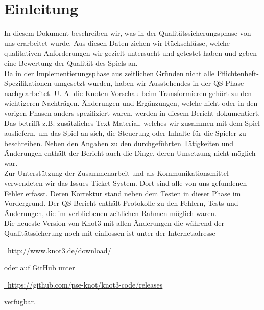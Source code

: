 %



\chapter{Einleitung}
\label{Kapitel:Einleitung}

In diesem Dokument beschreiben wir, was in der Qualitätssicherungsphase von uns erarbeitet wurde. Aus diesen Daten ziehen wir Rückschlüsse, welche qualitativen Anforderungen wir gezielt untersucht und getestet haben und geben eine Bewertung der Qualität des Spiels an.\\

Da in der Implementierungsphase aus zeitlichen Gründen nicht alle Pflichtenheft-Spezifikationen umgesetzt wurden, haben wir Ausstehendes in der QS-Phase nachgearbeitet. U. A. die Knoten-Vorschau beim Transformieren gehört zu den wichtigeren Nachträgen. Änderungen und Ergänzungen, welche nicht oder in den vorigen Phasen anders spezifiziert waren, werden in diesem Bericht dokumentiert. Das betrifft z.B. zusätzliches Text-Material, welches wir zusammen mit dem Spiel ausliefern, um das Spiel an sich, die Steuerung oder Inhalte für die Spieler zu beschreiben. Neben den Angaben zu den durchgeführten Tätigkeiten und Änderungen enthält der Bericht auch die Dinge, deren Umsetzung nicht möglich war.\\

Zur Unterstützung der Zusammenarbeit und als Kommunikationsmittel verwendeten wir das \glqq Issues\grqq-Ticket-System. Dort sind alle von uns gefundenen Fehler erfasst. Deren Korrektur stand neben dem Testen in dieser Phase im Vordergrund. Der QS-Bericht enthält Protokolle zu den Fehlern, Tests und Änderungen, die im verbliebenen zeitlichen Rahmen möglich waren.\\

Die neueste Version von Knot3 mit allen Änderungen die während der Qualitätssicherung noch mit einflossen ist unter der Internetadresse\\

\begin{center}
\href{http://www.knot3.de/download/}{\mousecursor~http://www.knot3.de/download/}\\
\end{center}

oder auf GitHub unter\\

\begin{center}
\href{https://github.com/pse-knot/knot3-code/releases}{\mousecursor~https://github.com/pse-knot/knot3-code/releases}\\
\end{center}

verfügbar.



